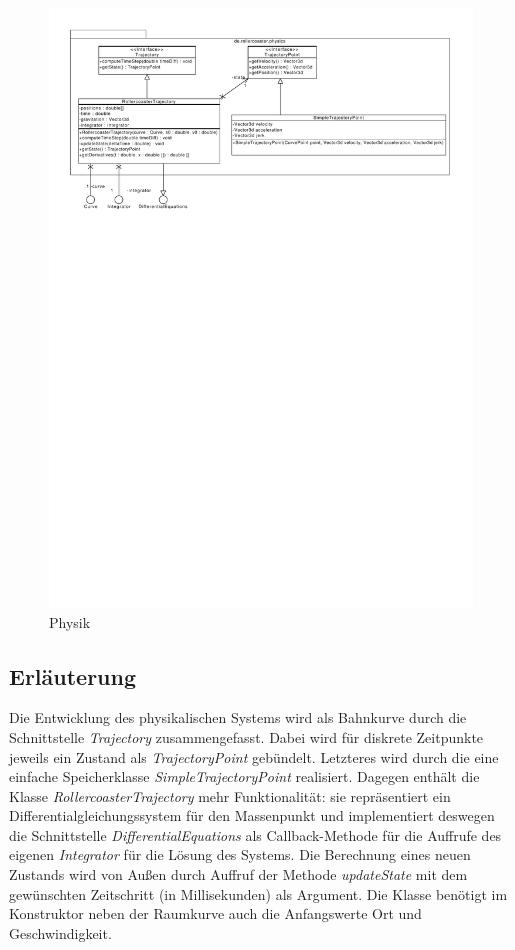 \begin{figure}
\includegraphics[width=\linewidth]{bilder/Physics}
\caption{Physik}
\label{fig:physics}
\end{figure}

\subsection{Erläuterung}

Die Entwicklung des physikalischen Systems wird als Bahnkurve durch die Schnittstelle
\emph{Trajectory} zusammengefasst. Dabei wird für diskrete Zeitpunkte jeweils ein
Zustand als \emph{TrajectoryPoint} gebündelt. Letzteres wird durch die eine
einfache Speicherklasse  \emph{SimpleTrajectoryPoint} realisiert.
Dagegen enthält die Klasse \emph{RollercoasterTrajectory} mehr Funktionalität: sie
repräsentiert ein Differentialgleichungssystem für den Massenpunkt und implementiert
deswegen die Schnittstelle \emph{DifferentialEquations} als Callback-Methode für
die Auffrufe des eigenen \emph{Integrator} für die Lösung des Systems. Die Berechnung
eines neuen Zustands wird von Außen durch Auffruf der Methode \emph{updateState} mit
dem gewünschten Zeitschritt (in Millisekunden) als Argument. Die Klasse benötigt im 
Konstruktor neben der Raumkurve auch die Anfangswerte Ort und Geschwindigkeit.

